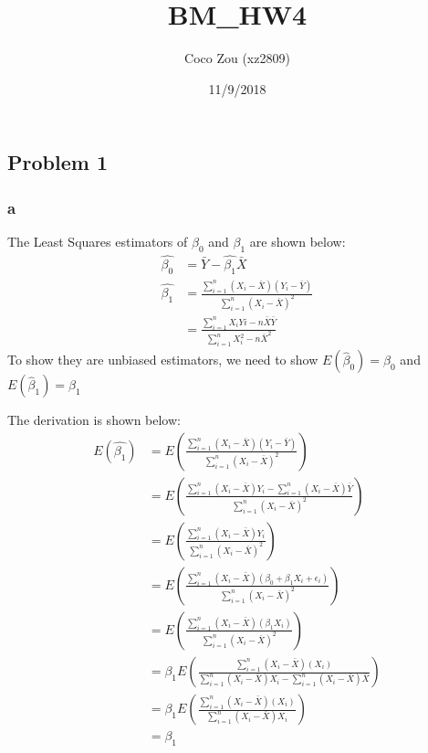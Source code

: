 \documentclass[]{article}
\title{BM\_HW4}
\author{Coco Zou (xz2809)}
\date{11/9/2018}
\begin{document}
\maketitle

\subsection{Problem 1}\label{problem-1}

\subsubsection{a}\label{a}

The Least Squares estimators of \(\beta_{0}\) and \(\beta_{1}\) are
shown below: \[
\begin{aligned}
\hat{\beta_{0}} &= \bar{Y} - \hat{\beta_{1}}\bar{X}\\
\hat{\beta_{1}} &= \frac{\sum_{i=1}^{n} (X_{i} - \bar{X})(Y_{i} - \bar{Y})} {\sum_{i=1}^{n} (X_{i} - \bar{X})^2} \\
&= \frac{\sum_{i=1}^{n} X_{i}Y{i} - n\bar{X}\bar{Y}}{\sum_{i=1}^{n}X_{i}^2 - n\bar{X}^2}
\end{aligned}
\] To show they are unbiased estimators, we need to show
\(E(\hat{\beta}_{0}) = \beta_{0}\) and
\(E(\hat{\beta}_{1}) = \beta_{1}\)

The derivation is shown below: \[
\begin{aligned}
E(\hat{\beta_{1}}) &= E(\frac{\sum_{i=1}^{n} (X_{i} - \bar{X})(Y_{i} - \bar{Y})} {\sum_{i=1}^{n} (X_{i} - \bar{X})^2}) \\
&= E(\frac{\sum_{i=1}^{n} (X_{i} - \bar{X})Y_{i} - \sum_{i=1}^{n} (X_{i} - \bar{X})\bar{Y}} {\sum_{i=1}^{n} (X_{i} - \bar{X})^2})\\
&= E(\frac{\sum_{i=1}^{n} (X_{i} - \bar{X})Y_{i}} {\sum_{i=1}^{n} (X_{i} - \bar{X})^2}) \\
&= E(\frac{\sum_{i=1}^{n} (X_{i} - \bar{X})(\beta_{0}+\beta_{1}X_{i}+\epsilon_{i})} {\sum_{i=1}^{n} (X_{i} - \bar{X})^2}) \\
&= E(\frac{\sum_{i=1}^{n} (X_{i} - \bar{X})(\beta_{1}X_{i})} {\sum_{i=1}^{n} (X_{i} - \bar{X})^2})\\
&=\beta_{1}E( \frac{\sum_{i=1}^{n} (X_{i} - \bar{X})(X_{i})} {\sum_{i=1}^{n} (X_{i} - \bar{X})X_{i} - \sum_{i=1}^{n} (X_{i} - \bar{X})\bar{X}}) \\
&= \beta_{1}E(\frac{\sum_{i=1}^{n} (X_{i} - \bar{X})(X_{i})} {\sum_{i=1}^{n} (X_{i} - \bar{X})X_{i}})\\
&= \beta_{1}
\end{aligned}
\]
\end{document}
